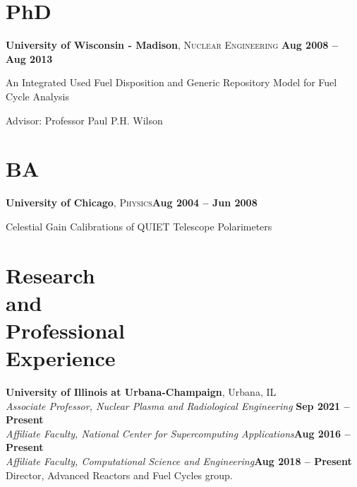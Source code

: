 \documentclass[margin,line]{resume}
\begin{document}
\begin{resume}
    \section{\mysidestyle PhD}
    \textbf{University of Wisconsin - Madison}, \textsc{Nuclear Engineering}\hfill \textbf{ Aug 2008 -- Aug 2013}\vspace{-3mm}\\\vspace{-1mm}%
    \begin{list2}
        \item An Integrated Used Fuel Disposition and Generic Repository Model for Fuel Cycle Analysis
        \item Advisor:  Professor Paul P.H. Wilson
    \end{list2}\vspace{-1.5mm}
    \section{\mysidestyle BA}
    \textbf{University of Chicago}, \textsc{Physics}\hfill\textbf{Aug 2004 -- Jun 2008}\vspace{-3mm}\\\vspace{-1mm}%
    \begin{list2}
        \item Celestial Gain Calibrations of QUIET Telescope Polarimeters
    \end{list2}\vspace{-1.5mm}
    \section{\mysidestyle Research\\and\\Professional\\Experience}
    
    \textbf{University of Illinois at Urbana-Champaign}, Urbana, IL\\
                \textsl{Associate Professor, Nuclear Plasma and Radiological Engineering} \hfill \textbf{Sep 2021 -- Present}\\
                \textsl{Affiliate Faculty, National Center for Supercomputing Applications}\hfill \textbf{Aug 2016 -- Present}\\
                \textsl{Affiliate Faculty, Computational Science and Engineering}\hfill \textbf{Aug 2018 -- Present}\\
                Director, Advanced Reactors and Fuel Cycles group.


\end{resume}
\end{document}
